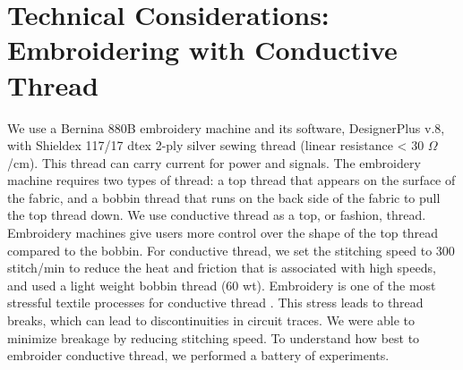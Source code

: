 \documentclass{sigchi}
\begin{document}







\section{Technical Considerations: Embroidering with Conductive Thread}

We use a Bernina 880B
embroidery machine and its software, DesignerPlus v.8, with Shieldex 117/17 dtex 2-ply silver sewing thread (linear resistance < 30 $\Omega$/cm). 
This thread can carry current for power and signals. The embroidery machine requires two types of thread: a top thread that appears on the surface of the fabric, and a bobbin thread that runs on the back side of the fabric to pull the top thread down. We use conductive thread as a top, or fashion, thread. Embroidery machines give users more control over the shape of the top thread compared to the bobbin. For conductive thread, we set the stitching speed to 300 stitch/min to reduce the heat and friction that is associated with high speeds, and used a light weight bobbin thread (60 wt). Embroidery is one of the most stressful textile processes for conductive thread \cite{5387040}. This stress leads to thread breaks, which can lead to discontinuities in circuit traces. We were able to minimize breakage by reducing stitching speed. To understand how best to embroider conductive thread, we performed a battery of experiments.
\end{document}
